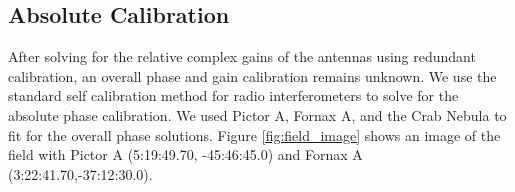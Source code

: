 \documentclass[twocolumn,numberedappendix]{emulateapj} \shorttitle{New Limits on the 21 cm Power Spectrum at $z=8.4$}
\begin{document}
\subsection{Absolute Calibration}\label{sec:abscal}
%

After solving for the relative complex gains of the antennas using redundant
calibration, an overall phase and gain calibration remains unknown. We use the
standard self calibration method for radio interferometers to solve for the
absolute phase calibration. We used Pictor A, Fornax A, and the Crab Nebula to
fit for the overall phase solutions. Figure \ref{fig:field_image} shows an image
of the field with Pictor A (5:19:49.70, -45:46:45.0)  and Fornax A
(3:22:41.70,-37:12:30.0).

%      
%
%
\end{document}

